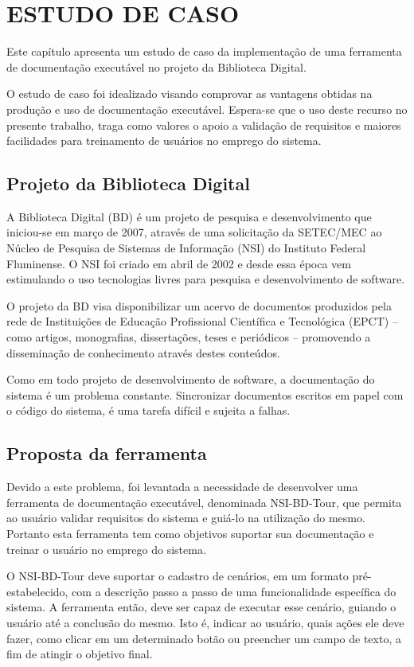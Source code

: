 \chapter{ESTUDO DE CASO}

Este capítulo apresenta um estudo de caso da implementação de uma ferramenta de documentação executável no projeto da Biblioteca Digital.

O estudo de caso foi idealizado visando comprovar as vantagens obtidas na produção e uso de documentação executável. Espera-se que o uso deste recurso no presente trabalho, traga como valores o apoio a validação de requisitos e maiores facilidades para treinamento de usuários no emprego do sistema.

\section{Projeto da Biblioteca Digital}

A Biblioteca Digital (BD) é um projeto de pesquisa e desenvolvimento que iniciou-se em março de 2007, através de uma solicitação da SETEC/MEC ao Núcleo de Pesquisa de Sistemas de Informação (NSI) do Instituto Federal Fluminense. O NSI foi criado em abril de 2002 e desde essa época vem estimulando o uso tecnologias livres para pesquisa e desenvolvimento de software.

O projeto da BD visa disponibilizar um acervo de documentos produzidos pela rede de Instituições de Educação Profissional Científica e Tecnológica (EPCT) – como artigos, monografias, dissertações, teses e periódicos – promovendo a disseminação de conhecimento através destes conteúdos.

Como em todo projeto de desenvolvimento de software, a documentação do sistema é um problema constante. Sincronizar documentos escritos em papel com o código do sistema, é uma tarefa difícil e sujeita a falhas.

\section{Proposta da ferramenta}

Devido a este problema, foi levantada a necessidade de desenvolver uma ferramenta de documentação executável, denominada NSI-BD-Tour, que permita ao usuário validar requisitos do sistema e guiá-lo na utilização do mesmo. Portanto esta ferramenta tem como objetivos suportar sua documentação e treinar o usuário no emprego do sistema.

O NSI-BD-Tour deve suportar o cadastro de cenários, em um formato pré-estabelecido, com a descrição passo a passo de uma funcionalidade específica do sistema. A ferramenta então, deve ser capaz de executar esse cenário, guiando o usuário até a conclusão do mesmo. Isto é, indicar ao usuário, quais ações ele deve fazer, como clicar em um determinado botão ou preencher um campo de texto, a fim de atingir o objetivo final.

